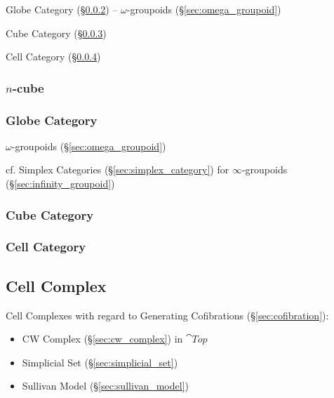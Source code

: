 \fist Globe Category (\S\ref{sec:globe_category}) --
$\omega$-groupoids (\S\ref{sec:omega_groupoid})

\fist Cube Category (\S\ref{sec:cube_category})

\fist Cell Category (\S\ref{sec:cell_category})



\subsubsection{$n$-cube}\label{sec:cellular_n_cube}

\subsubsection{Globe Category}\label{sec:globe_category}


$\omega$-groupoids (\S\ref{sec:omega_groupoid})

\fist cf. Simplex Categories (\S\ref{sec:simplex_category}) for
$\infty$-groupoids (\S\ref{sec:infinity_groupoid})



\subsubsection{Cube Category}\label{sec:cube_category}

\subsubsection{Cell Category}\label{sec:cell_category}



\subsection{Cell Complex}\label{sec:cell_complex}

Cell Complexes with regard to Generating Cofibrations
(\S\ref{sec:cofibration}):
\begin{itemize}
\item CW Complex (\S\ref{sec:cw_complex}) in $\cat{Top}$
\item Simplicial Set (\S\ref{sec:simplicial_set})
\item Sullivan Model (\S\ref{sec:sullivan_model})
\end{itemize}



